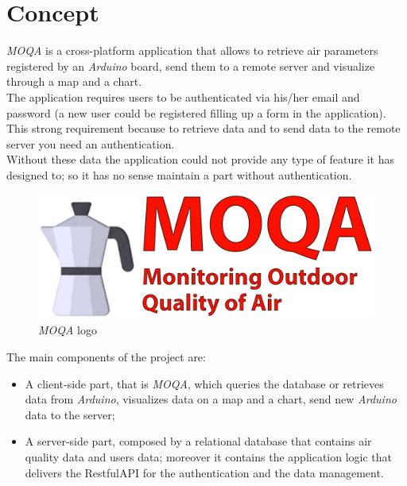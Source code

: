 \section{Concept}
\textit{MOQA} is a cross-platform application that allows to retrieve air parameters registered by an \textit{Arduino} board, send them to a remote server and visualize through a map and a chart.\\

The application requires users to be authenticated via his/her email and password (a new user could be registered filling up a form in the application). This strong requirement because to retrieve data and to send data to the remote server you need an authentication. \\ 
Without these data the application could not provide any type of feature it has designed to; so it has no sense maintain a part without authentication.\\

\begin{figure}[h]
\begin{center}
  \includegraphics{img/logo_moqa.png}
  \hspace{0.05\linewidth}
  \centering
  \caption{\textit{MOQA} logo}
  \label{img:logo_moqa}
\end{center}
\end{figure}
\clearpage

The main components of the project are:
\begin{itemize}
    \item A client-side part, that is \textit{MOQA}, which queries the database or retrieves data from \textit{Arduino}, visualizes data on a map and a chart, send new \textit{Arduino} data to the server;
    \item A server-side part, composed by a relational database that contains air quality data and users data; moreover it contains the application logic that delivers the RestfulAPI for the authentication and the data management.
\end{itemize}


